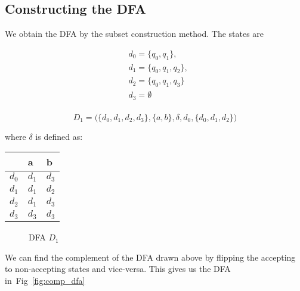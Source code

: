 \subsection*{Constructing the DFA}
We obtain the DFA by the subset construction method. The states are

\begin{equation}
\begin{split}
    & d_0 = \{q_0, q_1\},\\
    & d_1 = \{q_0, q_1, q_2\},\\
    & d_2 = \{q_0, q_1, q_3\}\\
    & d_3 = \emptyset \\
\end{split}
\end{equation}

\[ 
D_1 = \big( \{d_0, d_1, d_2, d_3\}, \{a,b\}, \delta, d_0, \{d_0, d_1, d_2\} \big)
\]

where $\delta$ is defined as:
\begin{tabular}{|l|l|l|}
\hline
    & a   & b   \\ \hline
$d_0$ & $d_1$ & $d_3$ \\
$d_1$ & $d_1$ & $d_2$ \\
$d_2$ & $d_1$ & $d_3$ \\
$d_3$ & $d_3$ & $d_3$ \\ \hline
\end{tabular}

\begin{figure}[ht]
\centering
{}
\caption{DFA $D_1$}
\label{fig:dfa}
\end{figure}



We can find the complement of the DFA drawn above by flipping the
accepting to non-accepting states and vice-versa. This gives
us the DFA in~Fig~\ref{fig:comp_dfa}

